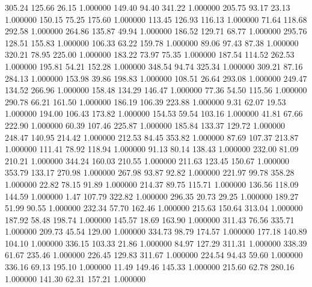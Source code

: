     305.24    125.66     26.15  1.000000
    149.40     94.40    341.22  1.000000
    205.75     93.17     23.13  1.000000
    150.15     75.25    175.60  1.000000
    113.45    126.93    116.13  1.000000
     71.64    118.68    292.58  1.000000
    264.86    135.87     49.94  1.000000
    186.52    129.71     68.77  1.000000
    295.76    128.51    155.83  1.000000
    106.33     63.22    159.78  1.000000
     89.06     97.43     87.38  1.000000
    320.21     78.95    225.00  1.000000
    183.22     73.97     75.35  1.000000
    187.54    114.52    262.53  1.000000
    195.81     54.21    152.28  1.000000
    348.54     94.74    325.34  1.000000
    309.21     87.16    284.13  1.000000
    153.98     39.86    198.83  1.000000
    108.51     26.64    293.08  1.000000
    249.47    134.52    266.96  1.000000
    158.48    134.29    146.47  1.000000
     77.36     54.50    115.56  1.000000
    290.78     66.21    161.50  1.000000
    186.19    106.39    223.88  1.000000
      9.31     62.07     19.53  1.000000
    194.00    106.43    173.82  1.000000
    154.53     59.54    103.16  1.000000
     41.81     67.66    222.90  1.000000
     60.39    107.46    225.87  1.000000
    185.84    133.37    129.72  1.000000
    248.47    140.95    214.42  1.000000
    212.53     84.45    353.82  1.000000
     87.69    107.37    213.87  1.000000
    111.41     78.92    118.94  1.000000
     91.13     80.14    138.43  1.000000
    232.00     81.09    210.21  1.000000
    344.24    160.03    210.55  1.000000
    211.63    123.45    150.67  1.000000
    353.79    133.17    270.98  1.000000
    267.98     93.87     92.82  1.000000
    221.97     99.78    358.28  1.000000
     22.82     78.15     91.89  1.000000
    214.37     89.75    115.71  1.000000
    136.56    118.09    144.59  1.000000
      1.47    107.79    322.82  1.000000
    296.35     20.73     29.25  1.000000
    189.27     51.99     90.55  1.000000
    232.34     57.70    162.46  1.000000
    215.63    150.64    313.04  1.000000
    187.92     58.48    198.74  1.000000
    145.57     18.69    163.90  1.000000
    311.43     76.56    335.71  1.000000
    209.73     45.54    129.00  1.000000
    334.73     98.79    174.57  1.000000
    177.18    140.89    104.10  1.000000
    336.15    103.33     21.86  1.000000
     84.97    127.29    311.31  1.000000
    338.39     61.67    235.46  1.000000
    226.45    129.83    311.67  1.000000
    224.54     94.43     59.60  1.000000
    336.16     69.13    195.10  1.000000
     11.49    149.46    145.33  1.000000
    215.60     62.78    280.16  1.000000
    141.30     62.31    157.21  1.000000
